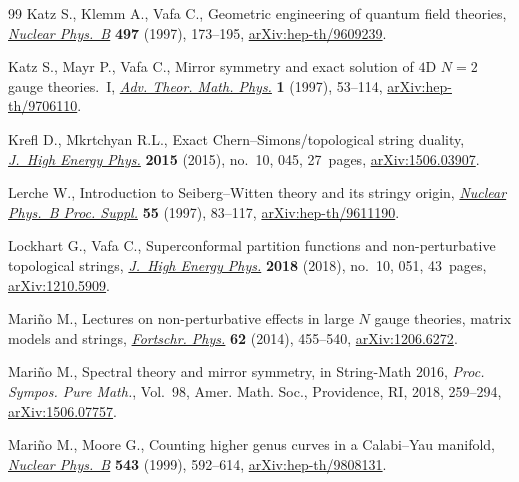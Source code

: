 \documentclass[pdftex]{sigma}
\numberwithin{equation}{section}
\begin{document}
\begin{thebibliography}{99}
Katz S., Klemm A., Vafa C., Geometric engineering of quantum field theories,
 \href{https://doi.org/10.1016/S0550-3213(97)00282-4}{\textit{Nuclear Phys.~B}} \textbf{497} (1997), 173--195,
 \href{https://arxiv.org/abs/hep-th/9609239}{arXiv:hep-th/9609239}.

Katz S., Mayr P., Vafa C., Mirror symmetry and exact solution of {$4$}{D}
 {$N=2$} gauge theories.~{I}, \href{https://doi.org/10.4310/ATMP.1997.v1.n1.a2}{\textit{Adv. Theor. Math. Phys.}} \textbf{1}
 (1997), 53--114, \href{https://arxiv.org/abs/hep-th/9706110}{arXiv:hep-th/9706110}.

Krefl D., Mkrtchyan R.L., Exact {C}hern--{S}imons/topological string duality,
 \href{https://doi.org/10.1007/JHEP10(2015)045}{\textit{J.~High Energy Phys.}} \textbf{2015} (2015), no.~10, 045, 27~pages,
 \href{https://arxiv.org/abs/1506.03907}{arXiv:1506.03907}.

Lerche W., Introduction to {S}eiberg--{W}itten theory and its stringy origin,
 \href{https://doi.org/10.1016/S0920-5632(97)00073-X}{\textit{Nuclear Phys.~B Proc. Suppl.}} \textbf{55} (1997), 83--117,
 \href{https://arxiv.org/abs/hep-th/9611190}{arXiv:hep-th/9611190}.

Lockhart G., Vafa C., Superconformal partition functions and non-perturbative
 topological strings, \href{https://doi.org/10.1007/jhep10(2018)051}{\textit{J.~High Energy Phys.}} \textbf{2018} (2018),
 no.~10, 051, 43~pages, \href{https://arxiv.org/abs/1210.5909}{arXiv:1210.5909}.

Mari\~no M., Lectures on non-perturbative effects in large {$N$} gauge
 theories, matrix models and strings, \href{https://doi.org/10.1002/prop.201400005}{\textit{Fortschr. Phys.}} \textbf{62}
 (2014), 455--540, \href{https://arxiv.org/abs/1206.6272}{arXiv:1206.6272}.

Mari\~no M., Spectral theory and mirror symmetry, in String-{M}ath 2016,
 \textit{Proc. Sympos. Pure Math.}, Vol.~98, Amer. Math. Soc., Providence, RI,
 2018, 259--294, \href{https://arxiv.org/abs/1506.07757}{arXiv:1506.07757}.

Mari\~no M., Moore G., Counting higher genus curves in a {C}alabi--{Y}au
 manifold, \href{https://doi.org/10.1016/S0550-3213(98)00847-5}{\textit{Nuclear Phys.~B}} \textbf{543} (1999), 592--614,
 \href{https://arxiv.org/abs/hep-th/9808131}{arXiv:hep-th/9808131}.


\end{thebibliography}
\end{document}
